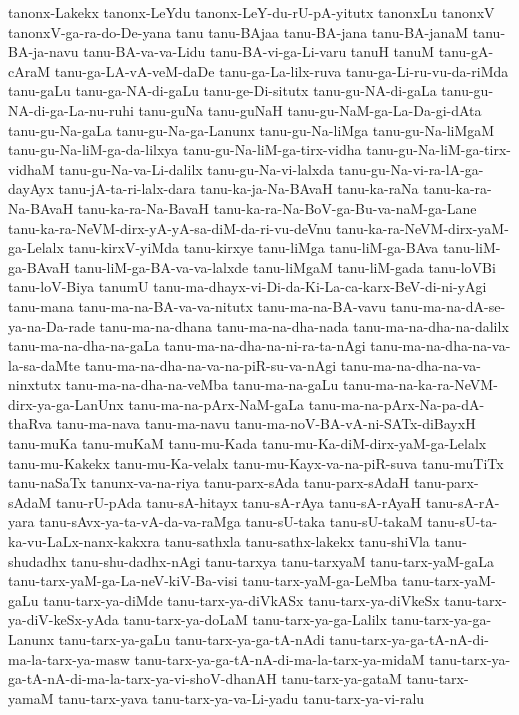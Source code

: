 {tanonx-Lakekx
tanonx-LeYdu
tanonx-LeY-du-rU-pA-yitutx
tanonxLu
tanonxV
tanonxV-ga-ra-do-De-yana
tanu
tanu-BAjaa
tanu-BA-jana
tanu-BA-janaM
tanu-BA-ja-navu
tanu-BA-va-va-Lidu
tanu-BA-vi-ga-Li-varu
tanuH
tanuM
tanu-gA-cAraM
tanu-ga-LA-vA-veM-daDe
tanu-ga-La-lilx-ruva
tanu-ga-Li-ru-vu-da-riMda
tanu-gaLu
tanu-ga-NA-di-gaLu
tanu-ge-Di-situtx
tanu-gu-NA-di-gaLa
tanu-gu-NA-di-ga-La-nu-ruhi
tanu-guNa
tanu-guNaH
tanu-gu-NaM-ga-La-Da-gi-dAta
tanu-gu-Na-gaLa
tanu-gu-Na-ga-Lanunx
tanu-gu-Na-liMga
tanu-gu-Na-liMgaM
tanu-gu-Na-liM-ga-da-lilxya
tanu-gu-Na-liM-ga-tirx-vidha
tanu-gu-Na-liM-ga-tirx-vidhaM
tanu-gu-Na-va-Li-dalilx
tanu-gu-Na-vi-lalxda
tanu-gu-Na-vi-ra-lA-ga-dayAyx
tanu-jA-ta-ri-lalx-dara
tanu-ka-ja-Na-BAvaH
tanu-ka-raNa
tanu-ka-ra-Na-BAvaH
tanu-ka-ra-Na-BavaH
tanu-ka-ra-Na-BoV-ga-Bu-va-naM-ga-Lane
tanu-ka-ra-NeVM-dirx-yA-yA-sa-diM-da-ri-vu-deVnu
tanu-ka-ra-NeVM-dirx-yaM-ga-Lelalx
tanu-kirxV-yiMda
tanu-kirxye
tanu-liMga
tanu-liM-ga-BAva
tanu-liM-ga-BAvaH
tanu-liM-ga-BA-va-va-lalxde
tanu-liMgaM
tanu-liM-gada
tanu-loVBi
tanu-loV-Biya
tanumU
tanu-ma-dhayx-vi-Di-da-Ki-La-ca-karx-BeV-di-ni-yAgi
tanu-mana
tanu-ma-na-BA-va-va-nitutx
tanu-ma-na-BA-vavu
tanu-ma-na-dA-se-ya-na-Da-rade
tanu-ma-na-dhana
tanu-ma-na-dha-nada
tanu-ma-na-dha-na-dalilx
tanu-ma-na-dha-na-gaLa
tanu-ma-na-dha-na-ni-ra-ta-nAgi
tanu-ma-na-dha-na-va-la-sa-daMte
tanu-ma-na-dha-na-va-na-piR-su-va-nAgi
tanu-ma-na-dha-na-va-ninxtutx
tanu-ma-na-dha-na-veMba
tanu-ma-na-gaLu
tanu-ma-na-ka-ra-NeVM-dirx-ya-ga-LanUnx
tanu-ma-na-pArx-NaM-gaLa
tanu-ma-na-pArx-Na-pa-dA-thaRva
tanu-ma-nava
tanu-ma-navu
tanu-ma-noV-BA-vA-ni-SATx-diBayxH
tanu-muKa
tanu-muKaM
tanu-mu-Kada
tanu-mu-Ka-diM-dirx-yaM-ga-Lelalx
tanu-mu-Kakekx
tanu-mu-Ka-velalx
tanu-mu-Kayx-va-na-piR-suva
tanu-muTiTx
tanu-naSaTx
tanunx-va-na-riya
tanu-parx-sAda
tanu-parx-sAdaH
tanu-parx-sAdaM
tanu-rU-pAda
tanu-sA-hitayx
tanu-sA-rAya
tanu-sA-rAyaH
tanu-sA-rA-yara
tanu-sAvx-ya-ta-vA-da-va-raMga
tanu-sU-taka
tanu-sU-takaM
tanu-sU-ta-ka-vu-LaLx-nanx-kakxra
tanu-sathxla
tanu-sathx-lakekx
tanu-shiVla
tanu-shudadhx
tanu-shu-dadhx-nAgi
tanu-tarxya
tanu-tarxyaM
tanu-tarx-yaM-gaLa
tanu-tarx-yaM-ga-La-neV-kiV-Ba-visi
tanu-tarx-yaM-ga-LeMba
tanu-tarx-yaM-gaLu
tanu-tarx-ya-diMde
tanu-tarx-ya-diVkASx
tanu-tarx-ya-diVkeSx
tanu-tarx-ya-diV-keSx-yAda
tanu-tarx-ya-doLaM
tanu-tarx-ya-ga-Lalilx
tanu-tarx-ya-ga-Lanunx
tanu-tarx-ya-gaLu
tanu-tarx-ya-ga-tA-nAdi
tanu-tarx-ya-ga-tA-nA-di-ma-la-tarx-ya-masw
tanu-tarx-ya-ga-tA-nA-di-ma-la-tarx-ya-midaM
tanu-tarx-ya-ga-tA-nA-di-ma-la-tarx-ya-vi-shoV-dhanAH
tanu-tarx-ya-gataM
tanu-tarx-yamaM
tanu-tarx-yava
tanu-tarx-ya-va-Li-yadu
tanu-tarx-ya-vi-ralu
}
